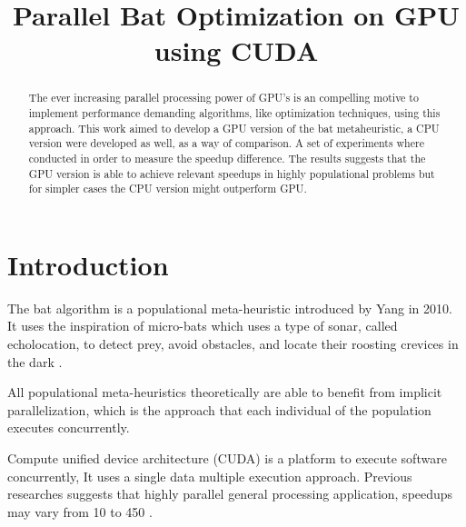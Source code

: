 \documentclass[conference]{IEEEtran}
\begin{document}
\title{Parallel Bat Optimization on GPU using CUDA}

\author{
\and
{}
}

\maketitle
\begin{abstract}
The ever increasing parallel processing power of GPU's is an compelling
motive to implement performance demanding algorithms, like optimization
techniques, using this approach. This work aimed to develop a GPU
version of the bat metaheuristic, a CPU version were developed as well,
as a way of comparison. A set of experiments where conducted in order
to measure the speedup difference. The results suggests that the GPU
version is able to achieve relevant speedups in highly populational
problems but for simpler cases the CPU version might outperform GPU.
\end{abstract}
\IEEEpeerreviewmaketitle

\section{Introduction}

The bat algorithm is a populational meta-heuristic introduced by Yang in
2010. It uses the inspiration of micro-bats which uses a type of sonar,
called echolocation, to detect prey, avoid obstacles, and locate their
roosting crevices in the dark \cite{original}.

All populational meta-heuristics theoretically are able to benefit from
implicit parallelization, which is the approach that each individual of
the population executes concurrently.

Compute unified device architecture (CUDA) is a platform to execute
software concurrently, It uses a single data multiple execution
approach. Previous researches suggests that highly parallel
general processing application, speedups may vary from 10 to 450
\cite{cuda_optimizations}.
\end{document}
